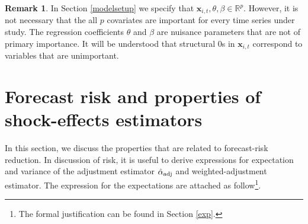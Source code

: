 \documentclass[11pt]{article}
\def\mbf#1{\mathbf{#1}} %
\newcommand{\reals}{\mathbb{R}} %
\theoremstyle{definition}
\newtheorem{remark}{Remark}
\begin{document}
\begin{remark}
In Section \ref{modelsetup} we specify that $\mbf{x}_{i,t}, \theta, \beta \in \reals^p$. 
However, it is not necessary that the all $p$ covariates are important for every time series under study. The regression coefficients $\theta$ and $\beta$ are nuisance parameters that are not of primary importance. 
It will be understood that structural 0s in $\mbf{x}_{i,t}$ correspond to variables that are unimportant. 
\end{remark}



\section{Forecast risk and properties of shock-effects estimators}
\label{properties}

In this section, we discuss the properties that are related to forecast-risk reduction. In discussion of risk, it is useful to derive expressions for expectation and variance of the adjustment estimator $\hat{\alpha}_{\rm adj}$ and weighted-adjustment estimator.  The expression for the expectations are attached as follow\footnote{The formal justification can be found in Section \ref{exp}.}.
\end{document}
